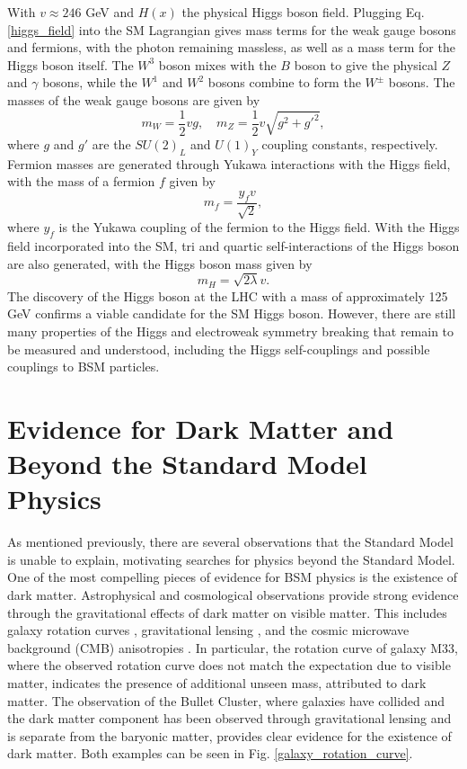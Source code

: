 With $v \approx 246$ GeV and $H(x)$ the physical Higgs boson field.
Plugging Eq. \ref{higgs_field} into the SM Lagrangian gives mass terms for the weak gauge bosons and fermions, with the photon remaining massless, as well as a mass term for the Higgs boson itself.
The $W^3$ boson mixes with the $B$ boson to give the physical $Z$ and $\gamma$ bosons, while the $W^1$ and $W^2$ bosons combine to form the $W^{\pm}$ bosons.
The masses of the weak gauge bosons are given by 
\begin{equation}
    m_W = \frac{1}{2}vg, \quad m_Z = \frac{1}{2}v\sqrt{g^2 + g'^2},
    \label{weak_boson_masses}
\end{equation}
where $g$ and $g'$ are the $SU(2)_L$ and $U(1)_Y$ coupling constants, respectively.
Fermion masses are generated through Yukawa interactions with the Higgs field, with the mass of a fermion $f$ given by 
\begin{equation}
    m_f = \frac{y_f v}{\sqrt{2}},
    \label{fermion_masses}
\end{equation}
where $y_f$ is the Yukawa coupling of the fermion to the Higgs field.
With the Higgs field incorporated into the SM, tri and quartic self-interactions of the Higgs boson are also generated, with the Higgs boson mass given by 
\begin{equation}
    m_H = \sqrt{2\lambda} v.
    \label{higgs_mass}
\end{equation}
The discovery of the Higgs boson at the LHC with a mass of approximately 125 GeV \cite{HIGG-2012-27,CMS-HIG-12-028} confirms a viable candidate for the SM Higgs boson.
However, there are still many properties of the Higgs and electroweak symmetry breaking that remain to be measured and understood, including the Higgs self-couplings and possible couplings to BSM particles.

\section{Evidence for Dark Matter and Beyond the Standard Model Physics}

As mentioned previously, there are several observations that the Standard Model is unable to explain, motivating searches for physics beyond the Standard Model.
One of the most compelling pieces of evidence for BSM physics is the existence of dark matter. 
Astrophysical and cosmological observations provide strong evidence through the gravitational effects of dark matter on visible matter.
This includes galaxy rotation curves \cite{1980ApJ...238..471R}, gravitational lensing \cite{Massey_2010}, and the cosmic microwave background (CMB) anisotropies \cite{Hu_2002}.
In particular, the rotation curve of galaxy M33, where the observed rotation curve does not match the expectation due to visible matter, indicates the presence of additional unseen mass, attributed to dark matter.
The observation of the Bullet Cluster, where galaxies have collided and the dark matter component has been observed through gravitational lensing and is separate from the baryonic matter, provides clear evidence for the existence of dark matter.
Both examples can be seen in Fig. \ref{galaxy_rotation_curve}.

